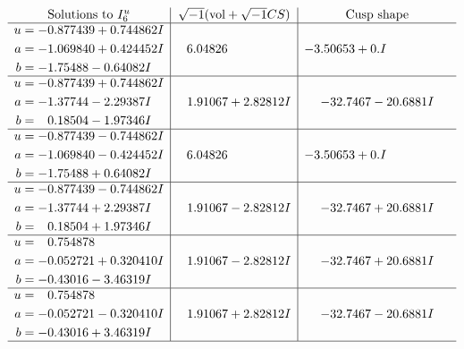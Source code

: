 \documentclass[1p]{elsarticle_modified}
\theoremstyle{definition}
\newcommand{\I}{\sqrt{-1}}
\begin{document}
$$\begin{array}{c|c|c}  
\text{Solutions to }I^u_{6}& \I (\text{vol} + \sqrt{-1}CS) & \text{Cusp shape}\\
 \hline 
\begin{aligned}
u &= -0.877439 + 0.744862 I \\
a &= -1.069840 + 0.424452 I \\
b &= -1.75488 - 0.64082 I\end{aligned}
 & \phantom{-}6.04826\phantom{ +0.000000I} & -3.50653 + 0. I\phantom{ +0.000000I} \\ \hline\begin{aligned}
u &= -0.877439 + 0.744862 I \\
a &= -1.37744 - 2.29387 I \\
b &= \phantom{-}0.18504 - 1.97346 I\end{aligned}
 & \phantom{-}1.91067 + 2.82812 I & -32.7467 - 20.6881 I \\ \hline\begin{aligned}
u &= -0.877439 - 0.744862 I \\
a &= -1.069840 - 0.424452 I \\
b &= -1.75488 + 0.64082 I\end{aligned}
 & \phantom{-}6.04826\phantom{ +0.000000I} & -3.50653 + 0. I\phantom{ +0.000000I} \\ \hline\begin{aligned}
u &= -0.877439 - 0.744862 I \\
a &= -1.37744 + 2.29387 I \\
b &= \phantom{-}0.18504 + 1.97346 I\end{aligned}
 & \phantom{-}1.91067 - 2.82812 I & -32.7467 + 20.6881 I \\ \hline\begin{aligned}
u &= \phantom{-}0.754878\phantom{ +0.000000I} \\
a &= -0.052721 + 0.320410 I \\
b &= -0.43016 - 3.46319 I\end{aligned}
 & \phantom{-}1.91067 - 2.82812 I & -32.7467 + 20.6881 I \\ \hline\begin{aligned}
u &= \phantom{-}0.754878\phantom{ +0.000000I} \\
a &= -0.052721 - 0.320410 I \\
b &= -0.43016 + 3.46319 I\end{aligned}
 & \phantom{-}1.91067 + 2.82812 I & -32.7467 - 20.6881 I\\
 \hline 
 \end{array}$$\newpage
\end{document}
